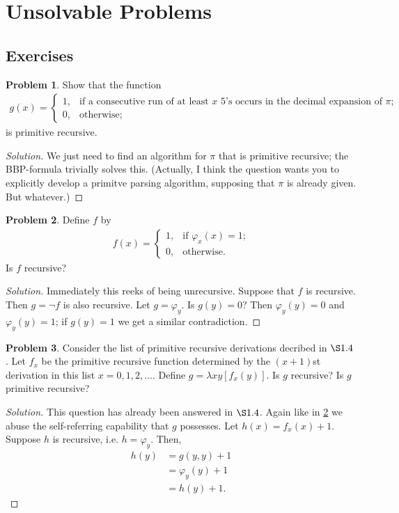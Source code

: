 \documentclass{article}
\theoremstyle{definition}
\newtheorem{prob}{Problem}[section]  %
\newenvironment{soln}
  {\begin{proof}[Solution]\setlength{\parskip}{0pt}} %
  {\end{proof}\vspace{-5pt}} %
\begin{document}
\newpage
\section{Unsolvable Problems}
\subsection{Exercises}
\begin{prob}
	Show that the function
	\begin{align*}
		g(x)=\begin{cases}
			1,&\text{if a consecutive run of at least $x$ 5's occurs in the decimal expansion of $\pi$;}\\
			0,&\text{otherwise;}
		\end{cases}
	\end{align*}
	is primitive recursive.
\end{prob}
\begin{soln}
	We just need to find an algorithm for $\pi$ that is primitive recursive; the BBP-formula trivially solves this. (Actually, I think the question wants you to explicitly develop a primitve parsing algorithm, supposing that $\pi$ is already given. But whatever.)
\end{soln}
\begin{prob}\label{2.2}
	Define $f$ by
	\begin{align*}
		f(x)=\begin{cases}
			1,&\text{if $\varphi_x(x)=1$;}\\
			0,&\text{otherwise.}
		\end{cases}
	\end{align*}
	Is $f$ recursive?
\end{prob}
\begin{soln}
	Immediately this reeks of being unrecursive. Suppose that $f$ is recursive. Then $g=\neg f$ is also recursive. Let $g=\varphi_y$. Is $g(y)=0$? Then $\varphi_y(y)=0$ and $\varphi_y(y)=1$; if $g(y)=1$ we get a similar contradiction.
\end{soln}
\begin{prob}
	Consider the list of primitive recursive derivations decribed in $\S 1.4$. Let $f_x$ be the primitive recursive function determined by the $(x+1)$st derivation in this list $x=0,1,2,\dots$. Define $g=\lambda xy[f_x(y)]$. Is $g$ recursive? Is $g$ primitive recursive?
\end{prob}
\begin{soln}
	This question has already been answered in $\S1.4$. Again like in \ref{2.2} we abuse the self-referring capability that $g$ possesses. Let $h(x)=f_x(x)+1$. Suppose $h$ is recursive, i.e. $h=\varphi_y$. Then,
	\begin{align*}
		h(y)&=g(y,y)+1\\
		&=\varphi_y(y)+1\\
		&=h(y)+1.
	\end{align*}
\end{soln}
\end{document}
